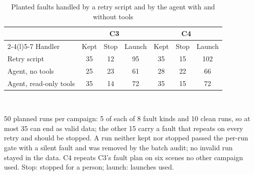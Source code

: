 \begin{table}[t]
\caption{Planted faults handled by a retry script and by the agent with and without tools}
\label{tab:recovery}
\centering\footnotesize
\setlength{\tabcolsep}{3pt}
\begin{tabular}{@{}lcccccc@{}}
\toprule
 & \multicolumn{3}{c}{C3} & \multicolumn{3}{c}{C4} \\
\cmidrule(lr){2-4}\cmidrule(l){5-7}
Handler & Kept & Stop & Launch & Kept & Stop & Launch \\
\midrule
Retry script & 35 & 12 & 95 & 35 & 15 & 102 \\
Agent, no tools & 25 & 23 & 61 & 28 & 22 & 66 \\
Agent, read-only tools & 35 & 14 & 72 & 35 & 15 & 72 \\
\bottomrule
\end{tabular}
\\[2pt]\parbox{\columnwidth}{\scriptsize 50 planned runs per campaign: 5 of each of 8 fault kinds and 10 clean runs, so at most 35 can end as valid data; the other 15 carry a fault that repeats on every retry and should be stopped. A run neither kept nor stopped passed the per-run gate with a silent fault and was removed by the batch audit; no invalid run stayed in the data. C4 repeats C3's fault plan on six scenes no other campaign used. Stop: stopped for a person; launch: launches used.}
\end{table}
